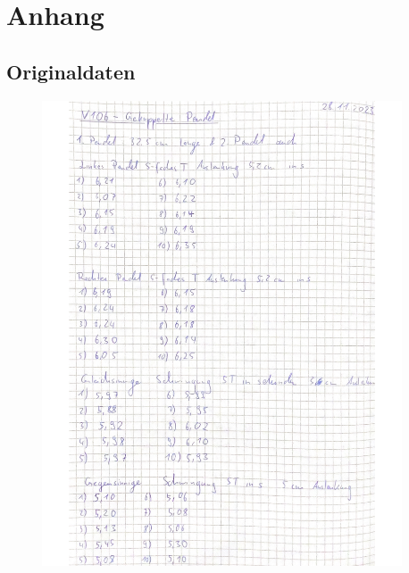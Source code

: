 \section{Anhang}
\label{sec:Anhang}
\subsection{Originaldaten}

 \begin{figure}[H]
   \centering
   \includegraphics[width=0.95\textwidth]{Messwerte01.pdf}
   \label{fig:Messungen_1}
 \end{figure}

